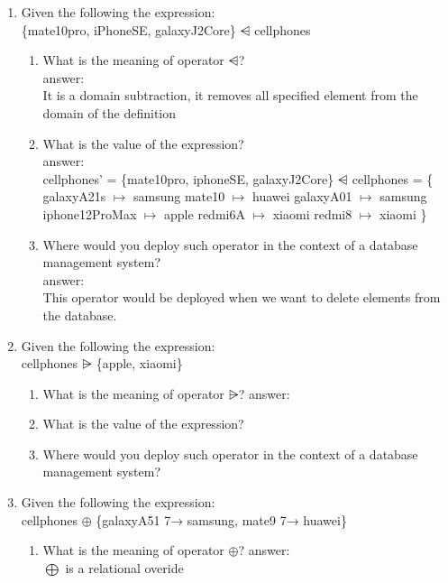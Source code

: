 \documentclass[12pt]{article}
\begin{document}
\begin{enumerate}
	\item Given the following the expression:\\ \{mate10pro, iPhoneSE, galaxyJ2Core\} $\ndres$ cellphones 
	\begin{enumerate} 
		\item What is the meaning of operator $\ndres$?\\
		answer:\\ 
		It is a domain subtraction, it removes all specified element from the domain of the definition
		\item What is the value of the expression?	\\
		answer:\\
		\indent cellphones' = \{mate10pro, iphoneSE, galaxyJ2Core\}  $\ndres$ cellphones = \{
		\newline	galaxyA21s $\mapsto$ samsung
		\newline	mate10 $\mapsto$ huawei
		\newline	galaxyA01 $\mapsto$ samsung
		\newline	iphone12ProMax $\mapsto$ apple
		\newline	redmi6A $\mapsto$ xiaomi
		\newline	redmi8 $\mapsto$ xiaomi
		\newline \}
		\item Where would you deploy such operator in the context of a database management system?\\
		answer:\\
		This operator would be deployed when we want to delete elements from the database.
	\end{enumerate}

	\item Given the following the expression:\\ cellphones $\nrres$ \{apple, xiaomi\}
	\begin{enumerate} 
		\item What is the meaning of operator $\nrres$? answer: 
		\item What is the value of the expression?	
		\item Where would you deploy such operator in the context of a database management system?
	\end{enumerate}

	\item Given the following the expression:\\ cellphones $\oplus$ \{galaxyA51 7→ samsung, mate9 7→ huawei\}
	\begin{enumerate} 
		\item What is the meaning of operator $\oplus$? 
		\indent answer: \\
		\indent $\bigoplus$ is a relational overide


\end{enumerate}
\end{enumerate}
\end{document}
